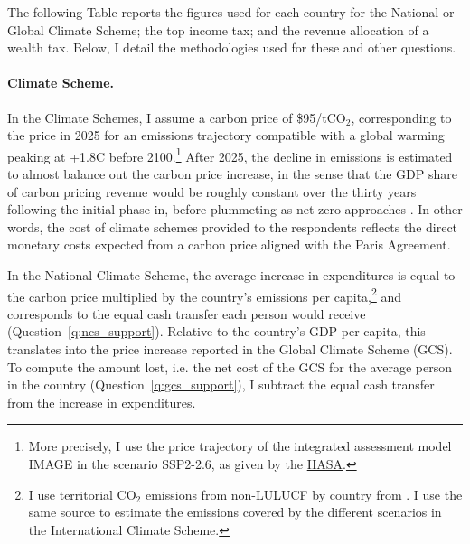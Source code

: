 The following Table %
reports the figures used for each country for the National or Global Climate Scheme; the top income tax; and the revenue allocation of a wealth tax. Below, I detail the methodologies used for these and other questions. 

\begin{table}[!h]
\caption*{\hypertarget{tab_features}{Country-specific features of the questionnaire}.}\label{tab:features}
\makebox[\textwidth][c]{}
\end{table}

\paragraph{Climate Scheme.} 

In the Climate Schemes, I assume a carbon price of \$95/tCO$_\text{2}$, corresponding to the price in 2025 for an emissions trajectory compatible with a global warming peaking at +1.8\textdegree{}C before 2100.\footnote{More precisely, I use the price trajectory of the integrated assessment model IMAGE in the scenario SSP2-2.6, as given by the \href{https://secure.iiasa.ac.at/web-apps/ene/SspDb/download/iam_v2/SSP_IAM_V2_201811.csv.zip}{IIASA}.} 
After 2025, the decline in emissions is estimated to almost balance out the carbon price increase, in the sense that the GDP share of carbon pricing revenue would be roughly constant over the thirty years following the initial phase-in, before plummeting as net-zero approaches \citep{fabre_global_2024}. In other words, the cost of climate schemes provided to the respondents reflects the direct monetary costs expected from a carbon price aligned with the Paris Agreement.  

In the National Climate Scheme, the average increase in expenditures is equal to the carbon price multiplied by the country's emissions per capita,\footnote{I use territorial CO$_\text{2}$ emissions from non-LULUCF by country from \cite{gutschow_country-resolved_2021}. I use the same source to estimate the emissions covered by the different scenarios in the International Climate Scheme.} and corresponds to the equal cash transfer each person would receive (Question~\ref{q:ncs_support}). Relative to the country's GDP per capita, this translates into the price increase reported in the Global Climate Scheme (GCS). To compute the amount lost, i.e. the net cost of the GCS for the average person in the country (Question~\ref{q:gcs_support}), I subtract the equal cash transfer from the increase in expenditures. 

